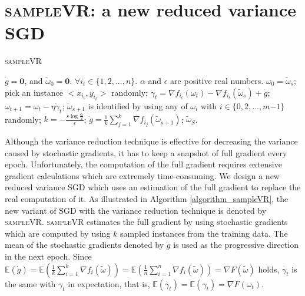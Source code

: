 \documentclass[letterpaper]{article}
\begin{document}
\section{\textsc{sampleVR}: a new reduced variance SGD}
\label{sect_sample_vr}

\begin{algorithm}[t]
    \caption{\textsc{sampleVR}}
    \label{algorithm_sampleVR}
    \begin{algorithmic}[1]
        \Require  $\dot{g}=\mathbf{0}$, and $\tilde{\omega}_0=\mathbf{0}$. $\forall i_t\in\{1,2, ..., n\}$.   $\alpha$ and $\epsilon$ are positive real numbers.
            \State $\omega_0=\tilde{\omega}_s$;
                \State pick an instance $\mathrm{<}x_{i_t},y_{i_t}\mathrm{>}$ randomly;
                \State $\dot{\gamma}_{t}=\nabla f_{i_t}(\omega_t)-\nabla f_{i_t}(\tilde{\omega}_s)+\dot{g}$;
                \State $\omega_{t+1} = \omega_t - \eta \dot{\gamma}_{t}$;
            \EndFor
            \State $\tilde{\omega}_{s+1}$ is identified by using any of $\omega_{i}$ with $i\mathrm{\in}\{0,2, ..., m\mathrm{-}1\}$ randomly;
            \State $k=-\frac{s\log\frac{\alpha}{2}}{\epsilon}$;
            \State $\dot{g} =\frac{1}{k}\sum\limits_{j=1}^{k}\nabla f_{i_j}(\tilde{\omega}_{s+1})$;
          \EndFor
        \Return $\tilde{\omega}_S$.
    \end{algorithmic}
\end{algorithm}

Although  the variance reduction technique is effective for decreasing the variance caused by stochastic gradients, it has to keep a snapshot of full gradient  every epoch. Unfortunately, the computation of the full gradient requires extensive gradient calculations which  are extremely time-consuming.  We design a new reduced variance SGD which uses an estimation of the full gradient to replace the real computation of it.  As illustrated in Algorithm \ref{algorithm_sampleVR}, the new variant of SGD with the variance reduction technique is denoted by \textsc{sampleVR}.  \textsc{sampleVR} estimates the full gradient by using  stochastic gradients which are computed by using $k$ sampled  instances  from the training data.  The mean of the stochastic gradients denoted by $\dot{g}$ is used as the progressive direction in the next epoch. Since  $\mathbb{E}(\dot{g}) \mathrm{=} \mathbb{E} \left(  \frac{1}{k}\sum\limits_{i=1}^k\nabla f_i(\tilde{\omega}) \right) \mathrm{=}  \mathbb{E} \left (\frac{1}{n}\sum\limits_{i=1}^n\nabla f_i(\tilde{\omega}) \right)  \mathrm{=}  \nabla F(\tilde{\omega})$ holds, $\dot{\gamma_t}$ is the same with $\gamma_t$ in expectation, that is, $\mathbb{E} (  \dot{\gamma_t}) = \mathbb{E} (\gamma_t) = \nabla F(\omega_{t})$. 
\end{document}

